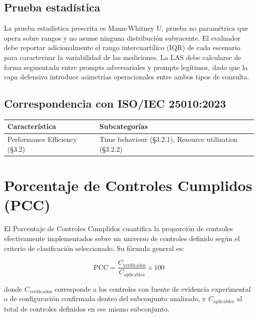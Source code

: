 \subsection{Prueba estadística}

La prueba estadística prescrita es Mann-Whitney U, prueba no paramétrica
que opera sobre rangos y no asume ninguna distribución subyacente. El
evaluador debe reportar adicionalmente el rango intercuartílico (IQR)
de cada escenario para caracterizar la variabilidad de las mediciones.
La LAS debe calcularse de forma segmentada entre prompts adversariales
y prompts legítimos, dado que la capa defensiva introduce asimetrías
operacionales entre ambos tipos de consulta.


\subsection{Correspondencia con ISO/IEC 25010:2023}

\begin{table}[H]
    \centering
    \renewcommand{\arraystretch}{1.4}
    \begin{tabular}{
      >{\raggedright\arraybackslash}p{4cm}
      >{\raggedright\arraybackslash}p{7.5cm}
    }
    \toprule
    \textbf{Característica} & \textbf{Subcategorías} \\
    \midrule
    Performance Efficiency (\S3.2) &
      Time behaviour (\S3.2.1), Resource utilization (\S3.2.2) \\
    \bottomrule
    \end{tabular}
\end{table}

\section{Porcentaje de Controles Cumplidos (PCC)}
\label{sec:pcc}

El Porcentaje de Controles Cumplidos cuantifica la proporción de
controles efectivamente implementados sobre un universo de controles
definido según el criterio de clasificación seleccionado. Su fórmula
general es:

\[
  \text{PCC} = \frac{C_{\text{verificados}}}{C_{\text{aplicables}}} \times 100
\]

donde $C_{\text{verificados}}$ corresponde a los controles con fuente
de evidencia experimental o de configuración confirmada dentro del
subconjunto analizado, y $C_{\text{aplicables}}$ al total de controles
definidos en ese mismo subconjunto.

